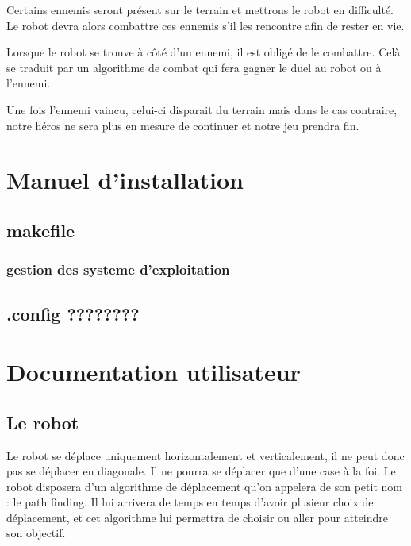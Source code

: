 \documentclass[a4paper 12pts]{article}
\begin{document}
Certains ennemis seront présent sur le terrain et mettrons le robot en difficulté. 
Le robot devra alors combattre ces ennemis s'il les rencontre afin de rester en vie.

Lorsque le robot se trouve à côté d'un ennemi, il est obligé de le combattre. 
Celà se traduit par un algorithme de combat qui fera gagner le duel au robot ou à l'ennemi. 

Une fois l'ennemi vaincu, celui-ci disparait du terrain mais dans le cas contraire, 
notre héros ne sera plus en mesure de continuer et notre jeu prendra fin.



\section{Manuel d'installation}

\subsection{makefile}

\subsubsection{gestion des systeme d'exploitation}

\subsection{.config ????????}


\section{Documentation utilisateur}

\subsection{Le robot}
Le robot se déplace uniquement horizontalement et verticalement, il ne peut donc pas se déplacer en diagonale. 
Il ne pourra se déplacer que d'une case à la foi.
Le robot disposera d'un algorithme de déplacement qu'on appelera de son petit nom : le path finding.
Il lui arrivera de temps en temps d'avoir plusieur choix de déplacement, et cet algorithme lui permettra de choisir ou aller pour atteindre son objectif.
\end{document}

